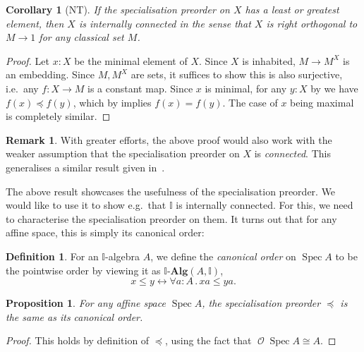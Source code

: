 \documentclass[a4paper,12pt]{amsart}
\newtheorem{corollary}[theorem]{Corollary}
\newtheorem{proposition}[theorem]{Proposition}
\theoremstyle{definition}
\newtheorem{definition}[theorem]{Definition}
\newtheorem{remark}[theorem]{Remark}
\newcommand{\mc}[1]{\mathcal{#1}}
\newcommand{\mb}[1]{\mathbf{#1}}
\newcommand{\mbb}[1]{\mathbb{#1}}
\newcommand{\I}{\mbb I}
\newcommand{\alg}{\text{-}\mb{Alg}}
\newcommand{\fa}[2]{\forall #1\!\colon\!\!#2\mathpunct{.}}
\newcommand{\eq}{\leftrightarrow}
\newcommand{\spec}{\operatorname{Spec}}
\newcommand{\opens}{\operatorname{\mc{O}}} %
\begin{document}
\begin{corollary}[NT]\label{cor:connectedpreservediscrete}
  If the specialisation preorder on $X$ has a least or greatest element, then $X$ is \emph{internally connected} in the sense that $X$ is right orthogonal to $M \to 1$ for any classical set $M$.
\end{corollary}
\begin{proof}
  Let $x:X$ be the minimal element of $X$. Since $X$ is inhabited, $M \to M^X$ is an embedding. Since $M,M^X$ are sets, it suffices to show this is also surjective, i.e.\ any $f \colon X \to M$ is a constant map. Since $x$ is minimal, for any $y:X$ by  we have $f(x) \preceq f(y)$, which by  implies $f(x) = f(y)$. The case of $x$ being maximal is completely similar.
\end{proof}

\begin{remark}
  With greater efforts, the above proof would also work with the weaker assumption that the specialisation preorder on $X$ is \emph{connected}. This generalises a similar result given in~\cite[Prop.~4.4.1]{hyland1990first}.
\end{remark}

The above result showcases the usefulness of the specialisation preorder. We would like to use it to show e.g.\ that $\I$ is internally connected. For this, we need to characterise the specialisation preorder on them. It turns out that for any affine space, this is simply its canonical order:


\begin{definition}
  For an $\I$-algebra $A$, we define the \emph{canonical order} on $\spec A$ to be the pointwise order by viewing it as $\I\alg(A,\I)$,
  \[ x \le y \eq \fa aA xa \le ya. \]
\end{definition}

\begin{proposition}\label{lem:specorderofaffine}
  For any affine space $\spec A$, the specialisation preorder $\preceq$ is the same as its canonical order.
\end{proposition}
\begin{proof}
  This holds by definition of $\preceq$, using the fact that $\opens{\spec A} \cong A$.
\end{proof}
\end{document}
